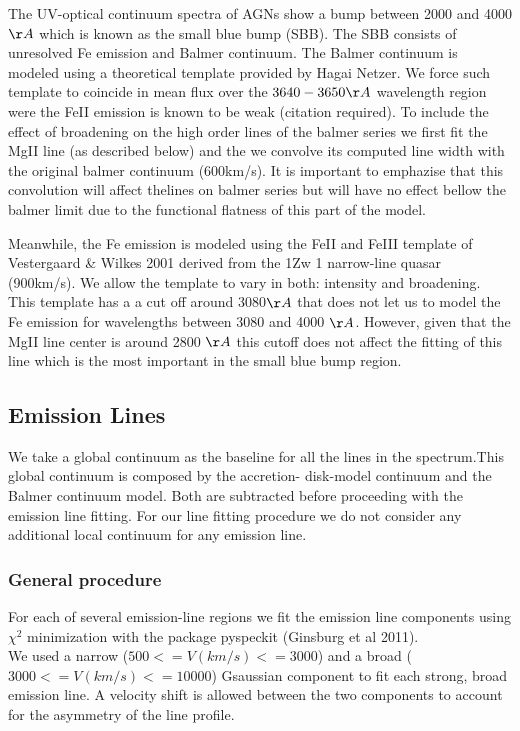 \documentclass[usenatbib]{mn2e}
\begin{document}
The UV-optical continuum spectra of AGNs  show a bump between 2000 and 4000 $\AA$ which is known as the small blue bump (SBB). The SBB  consists  of unresolved Fe emission and Balmer continuum.  
The Balmer continuum is modeled  using a theoretical template provided by Hagai Netzer. We force such template to coincide in mean flux over the $3640-3650 \AA$ wavelength  region were the FeII emission is known to be weak (citation required). To include the effect of broadening on the high order lines of the balmer series we first fit the MgII line (as described below) and the we convolve its computed line width with the original balmer continuum (600km/s). It is important to emphazise that this convolution will affect thelines on balmer series but will have no effect bellow the balmer limit due to the functional flatness of this part of the model.



Meanwhile, the Fe emission is modeled  using the FeII and FeIII template of  Vestergaard \& Wilkes 2001 derived from the  1Zw 1 narrow-line quasar (900km/s). We allow the template to vary in both: intensity and broadening. 
This template has a a cut off around 3080$\AA$ that does not let us to model the Fe emission for wavelengths between 3080 and 4000 $\AA$. However, given that the MgII line center is around 2800 $\AA$ this cutoff does not affect the fitting of this line which is the most important in the small blue bump region. 




	
\subsection{Emission Lines}

 We take a global continuum as the baseline for all the lines in the spectrum.This global continuum is composed by the  accretion- disk-model continuum  and the Balmer continuum model. Both are subtracted before proceeding with the emission line fitting. For our line fitting procedure we do not consider any additional local continuum for any emission line. 



\subsubsection{General procedure}
For each of several emission-line regions we fit the emission line components using $\chi^2$ minimization with the package pyspeckit (Ginsburg et al 2011).
\\
We used a narrow ($500<=V(km/s)<=3000$) and a broad ($3000<=V(km/s)<=10000$) Gsaussian component to fit each strong, broad emission line. A velocity shift is allowed between the two components to account for the asymmetry of the line profile.
\\
\end{document}
